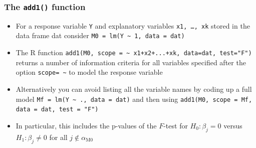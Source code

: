 \documentclass[a4paper]{article}\usepackage[]{graphicx}\usepackage[]{xcolor}
\begin{document}
\subsubsection{The \lstinline|add1()| function}
\begin{itemize}
	\item For a response variable \lstinline|Y| and explanatory variables \lstinline|x1, …, xk| stored in the data frame dat consider \lstinline|M0 = lm(Y ~ 1, data = dat)|
	\item The R function \lstinline|add1(M0, scope = ~ x1+x2+...+xk, data=dat, test="F")| returns a number of information criteria for all variables specified after the option \lstinline|scope= ~| to model the response variable
	\item Alternatively you can avoid listing all the variable names by coding up a full model \lstinline|Mf = lm(Y ~ ., data = dat)| and then using \lstinline|add1(M0, scope = Mf, data = dat, test = "F")|
	\item In particular, this includes the p-values of the \( F \)-test for \( H_0: \beta_j = 0 \) versus \( H_1: \beta_j \neq 0 \) for all \( j \notin \alpha_{\text{M0}} \)
\end{itemize}
\end{document}
